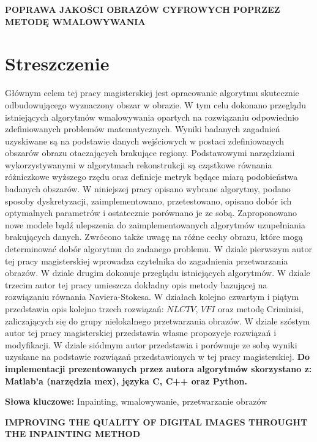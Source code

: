 \newpage
\begin{center}
\large \bf
POPRAWA JAKOŚCI OBRAZÓW CYFROWYCH POPRZEZ METODĘ WMALOWYWANIA
\end{center}
\section*{Streszczenie}
Głównym celem tej pracy magisterskiej jest opracowanie algorytmu skutecznie odbudowującego wyznaczony obszar w obrazie. W tym celu dokonano przeglądu istniejących algorytmów wmalowywania opartych na rozwiązaniu odpowiednio zdefiniowanych problemów matematycznych. Wyniki badanych zagadnień uzyskiwane są na podstawie danych wejściowych w postaci zdefiniowanych obszarów obrazu otaczających brakujące regiony. Podstawowymi narzędziami wykorzystywanymi w algorytmach rekonstrukcji są cząstkowe równania różniczkowe wyższego rzędu oraz definicje metryk będące miarą podobieństwa badanych obszarów. W niniejszej pracy opisano wybrane algorytmy, podano sposoby dyskretyzacji, zaimplementowano, przetestowano, opisano dobór ich optymalnych parametrów i ostatecznie porównano je ze sobą. Zaproponowano nowe modele bądź ulepszenia do zaimplementowanych algorytmów uzupełniania brakujących danych. Zwrócono także uwagę na różne cechy obrazu, które mogą determinować dobór algorytmu do zadanego problemu. W dziale pierwszym autor tej pracy magisterskiej wprowadza czytelnika do zagadnienia przetwarzania obrazów. W dziale drugim dokonuje przeglądu istniejących algorytmów. W dziale trzecim autor tej pracy umieszcza dokładny opis metody bazującej  na rozwiązaniu równania Naviera-Stokesa. W działach kolejno czwartym i piątym przedstawia opis kolejno trzech rozwiązań: $NLCTV$,  $VFI$ oraz metodę Criminisi, zaliczających się do grupy nielokalnego przetwarzania obrazów. W dziale szóstym autor tej pracy magisterskiej przedstawia własne propozycje rozwiązań i modyfikacji. W dziale siódmym autor przedstawia i porównuje ze sobą wyniki uzyskane na podstawie rozwiązań przedstawionych w tej pracy magisterskiej. \textbf{Do implementacji prezentowanych przez autora algorytmów skorzystano z: Matlab'a (narzędzia mex), języka C, C++ oraz Python.}


\bigskip
{\noindent \bf Słowa kluczowe:} Inpainting, wmalowywanie, przetwarzanie obrazów

\vskip 2cm

\begin{center}
\large \bf
IMPROVING THE QUALITY OF DIGITAL IMAGES THROUGHT THE INPAINTING METHOD
\end{center}

